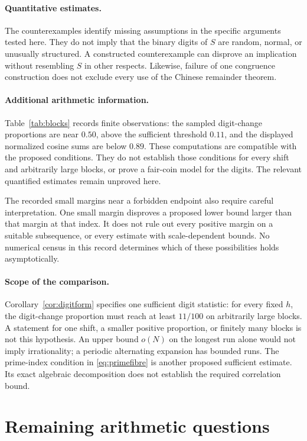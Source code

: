 \documentclass[11pt]{article}
\theoremstyle{plain}
\theoremstyle{definition}
\theoremstyle{remark}
\begin{document}
\paragraph{Quantitative estimates.}
The counterexamples identify missing assumptions in the specific
arguments tested here. They do not imply that the binary digits of $S$
are random, normal, or unusually structured. A constructed counterexample
can disprove an implication without resembling $S$ in other respects.
Likewise, failure of one congruence construction does not exclude every
use of the Chinese remainder theorem.

\paragraph{Additional arithmetic information.}
Table~\ref{tab:blocks} records finite observations: the sampled digit-change
proportions are near $0.50$, above the sufficient threshold $0.11$, and
the displayed normalized cosine sums are below $0.89$. These computations
are compatible with the proposed conditions. They do not establish those
conditions for every shift and arbitrarily large blocks, or prove a
fair-coin model for the digits. The relevant quantified estimates remain
unproved here.

The recorded small margins near a forbidden endpoint also require careful
interpretation. One small margin disproves a proposed lower bound larger
than that margin at that index. It does not rule out every positive margin
on a suitable subsequence, or every estimate with scale-dependent bounds.
No numerical census in this record determines which of these possibilities
holds asymptotically.

\paragraph{Scope of the comparison.}
Corollary~\ref{cor:digitform} specifies one sufficient digit statistic:
for every fixed $h$, the digit-change proportion must reach at least
$11/100$ on arbitrarily large blocks. A statement for one shift, a smaller
positive proportion, or finitely many blocks is not this hypothesis. An
upper bound $o(N)$ on the longest run alone would not imply irrationality;
a periodic alternating expansion has bounded runs. The prime-index
condition in \eqref{eq:primefibre} is another proposed sufficient estimate.
Its exact algebraic decomposition does not establish the required
correlation bound.
\section{Remaining arithmetic questions}
\end{document}
